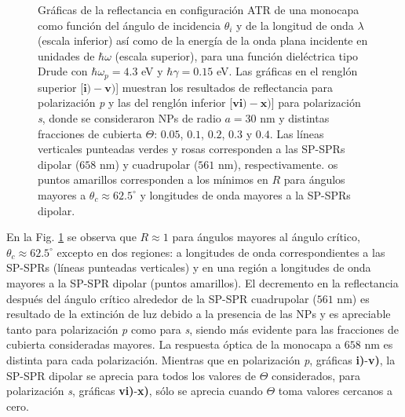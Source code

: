 \begin{figure}[h!]
\vspace*{-.5em}
	\caption{Gráficas de la reflectancia en configuración ATR de una monocapa como función del ángulo de incidencia $\theta_i$ y de la longitud de onda $\lambda$ (escala inferior) así como de la energía de la onda plana incidente en unidades de $\hbar\omega$ (escala superior), para una función dieléctrica tipo Drude con $\hbar\omega_p=4. 3$ eV  y  $\hbar\gamma=0. 15$ eV.  Las gráficas   en el renglón superior [$\mathbf{i)-v)}$]  muestran los resultados de reflectancia para  polarización \emph{p} y las del renglón inferior  [$\mathbf{vi)-x)}$] para polarización  \emph{s}, donde se consideraron NPs de radio $a=30$ nm y distintas fracciones de cubierta $\Theta$: $0. 05$, $0. 1$, $0. 2$, $0. 3$ y $0. 4$. Las líneas verticales punteadas verdes y rosas corresponden a las SP-SPRs dipolar ($658$ nm) y cuadrupolar ($561$ nm), respectivamente.	os puntos amarillos corresponden a los mínimos en $R$ para ángulos mayores a $\theta_c\approx 62.5^\circ$ y longitudes de onda mayores a la SP-SPRs dipolar.}	\label{fig:R-ATR4}	
	\end{figure}	

En la Fig.  \ref{fig:R-ATR4} se observa que $R\approx 1$ para ángulos mayores al ángulo crítico, $\theta_c \approx 62.5^\circ $ excepto en dos regiones: a longitudes de onda correspondientes a las SP-SPRs (líneas punteadas verticales) y en una región a longitudes de onda mayores a la SP-SPR dipolar (puntos amarillos). El decremento en la reflectancia después del ángulo crítico alrededor de la SP-SPR cuadrupolar ($561$ nm) es resultado de la extinción de luz debido a la presencia de las NPs y es apreciable tanto para polarización \emph{p} como para \emph{s}, siendo más evidente para las fracciones de cubierta consideradas mayores. La respuesta óptica de la monocapa a $658$ nm es distinta para cada polarización. Mientras que en polarización \emph{p}, gráficas \textbf{i)}-\textbf{v)}, la SP-SPR dipolar se aprecia para todos los valores de $\Theta$ considerados, para polarización \emph{s}, gráficas \textbf{vi)}-\textbf{x)},  sólo se aprecia cuando $\Theta$ toma valores cercanos a cero.

